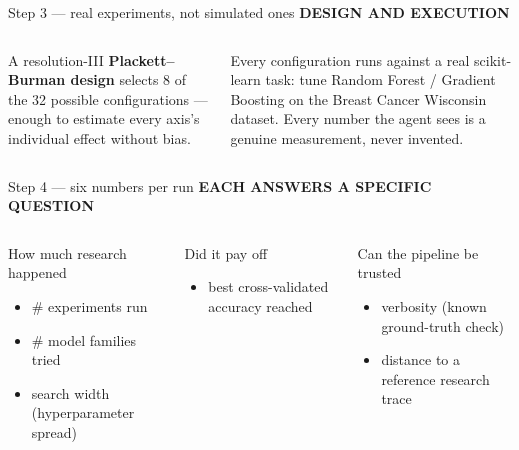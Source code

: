 \documentclass[aspectratio=169,11pt]{beamer}
\newcommand{\kicker}[1]{{\scriptsize\bfseries\color{accentDk}\MakeUppercase{#1}}\\[2pt]}
\begin{document}
\begin{frame}{Step 3 --- real experiments, not simulated ones}
\kicker{Design and execution}
\begin{columns}[T,onlytextwidth]
\small
A resolution-III \textbf{Plackett--Burman design} selects 8 of the 32 possible configurations --- enough to estimate every axis's individual effect without bias.

\vspace{3mm}
Every configuration runs against a real scikit-learn task: tune Random Forest / Gradient Boosting on the Breast Cancer Wisconsin dataset. Every number the agent sees is a genuine measurement, never invented.

\end{columns}
\end{frame}

\begin{frame}{Step 4 --- six numbers per run}
\kicker{Each answers a specific question}
\begin{columns}[T,onlytextwidth]
\begin{block}{\small How much research happened}
\footnotesize
\begin{itemize}
\item \# experiments run
\item \# model families tried
\item search width (hyperparameter spread)
\end{itemize}
\end{block}
\begin{block}{\small Did it pay off}
\footnotesize
\begin{itemize}
\item best cross-validated accuracy reached
\end{itemize}
\end{block}
\begin{block}{\small Can the pipeline be trusted}
\footnotesize
\begin{itemize}
\item verbosity (known ground-truth check)
\item distance to a reference research trace
\end{itemize}
\end{block}
\end{columns}
\end{frame}
\end{document}
